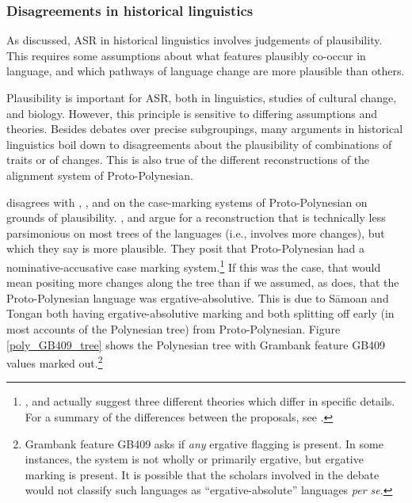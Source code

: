 \documentclass[12pt,letterpaper]{article}
\begin{document}

\FloatBarrier
\subsubsection{Disagreements in historical linguistics}
\label{sec:hl_disagreements}
As discussed, ASR in historical linguistics involves judgements of plausibility. This requires some assumptions about what features plausibly co-occur in language, and which pathways of language change are more plausible than others. 

Plausibility is important for ASR, both in linguistics, studies of cultural change, and biology. However, this principle is sensitive to differing assumptions and theories. Besides debates over precise subgroupings, many arguments in historical linguistics boil down to disagreements about the plausibility of combinations of traits or of changes. This is also true of the different reconstructions of the alignment system of Proto-Polynesian.

\citet{clark1973aspects} disagrees with \citet{hale_1968}, \citet{hohepa_1969}, and \citet{chung1978} on the case-marking systems of Proto-Polynesian on grounds of plausibility. \citeauthor{chung1978}, \citeauthor{hale_1968} and \citeauthor{hohepa_1969} argue for a reconstruction that is technically less parsimonious on most trees of the languages (i.e., involves more changes), but which they say is more plausible. They posit that Proto-Polynesian had a nominative-accusative case marking system.\footnote{\citeauthor{hale_1968}, \citeauthor{hohepa_1969} and \citeauthor{chung1978} actually suggest three different theories which differ in specific details. For a summary of the differences between the proposals, see \citet[247--249]{chung1978}.} If this was the case, that would mean positing more changes along the tree than if we assumed, as \citet{clark1973aspects} does, that the Proto-Polynesian language was ergative-absolutive. This is due to S\={a}moan and Tongan both having ergative-absolutive marking and both splitting off early (in most accounts of the Polynesian tree) from Proto-Polynesian. Figure \ref{poly_GB409_tree} shows the Polynesian tree with Grambank feature GB409 values marked out.\footnote{Grambank feature GB409 asks if \textit{any} ergative flagging is present. In some instances, the system is not wholly or primarily ergative, but ergative marking is present. It is possible that the scholars involved in the debate would not classify such languages as ``ergative-absolute'' languages \textit{per se}.}
\end{document}
